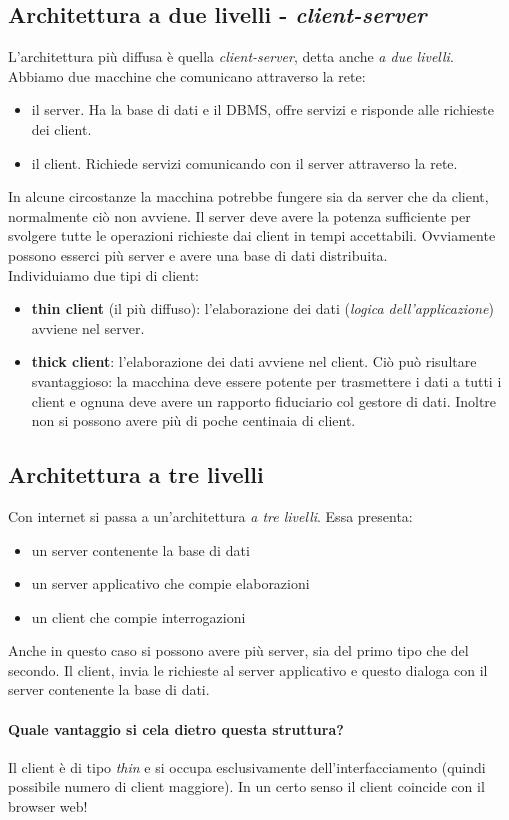 \subsection{Architettura a due livelli - \emph{client-server}}
L'architettura più diffusa è quella \emph{client-server}, detta anche \emph{a due livelli}. Abbiamo due macchine che comunicano attraverso la rete:
\begin{itemize}
	\item il server. Ha la base di dati e il DBMS, offre servizi e risponde alle richieste dei client.
	\item il client. Richiede servizi comunicando con il server attraverso la rete.
\end{itemize}
In alcune circostanze la macchina potrebbe fungere sia da server che da client, normalmente ciò non avviene. Il server deve avere la potenza sufficiente per svolgere tutte le operazioni richieste dai client in tempi accettabili. Ovviamente possono esserci più server e avere una base di dati distribuita.\\
Individuiamo due tipi di client:
\begin{itemize}
	\item \textbf{thin client} (il più diffuso): l'elaborazione dei dati (\emph{logica dell'applicazione}) avviene nel server. 
	\item \textbf{thick client}: l'elaborazione dei dati avviene nel client. Ciò può risultare svantaggioso: la macchina deve essere potente per trasmettere i dati a tutti i client e ognuna deve avere un rapporto fiduciario col gestore di dati. Inoltre non si possono avere più di poche centinaia di client.
\end{itemize}
\subsection{Architettura a tre livelli}
Con internet si passa a un'architettura \emph{a tre livelli}. Essa presenta:
\begin{itemize}
	\item un server contenente la base di dati
	\item un server applicativo che compie elaborazioni
	\item un client che compie interrogazioni
\end{itemize}
Anche in questo caso si possono avere più server, sia del primo tipo che del secondo. Il client, invia le richieste al server applicativo e questo dialoga con il server contenente la base di dati. 
\paragraph{Quale vantaggio si cela dietro questa struttura?} Il client è di tipo \emph{thin} e si occupa esclusivamente dell'interfacciamento (quindi possibile numero di client maggiore). In un certo senso il client coincide con il browser web! 
